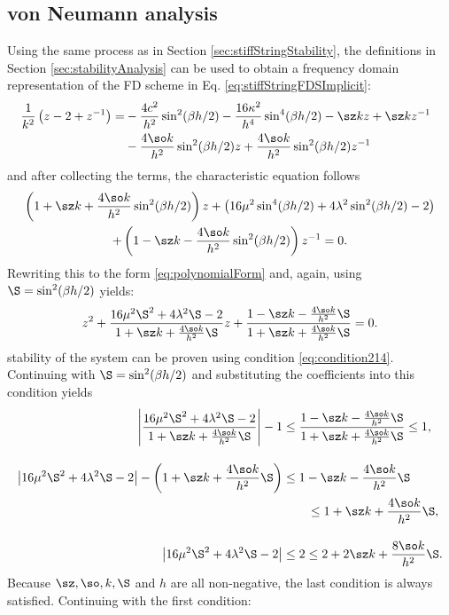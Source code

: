 {\subsection{von Neumann analysis}
Using the same process as in Section \ref{sec:stiffStringStability}, the definitions in Section \ref{sec:stabilityAnalysis} can be used to obtain a frequency domain representation of the FD scheme in Eq. \eqref{eq:stiffStringFDSImplicit}:
\begin{align}
    \!\!\!\!\frac{1}{k^2}\left(z - 2 + z^{-1}\right) =&-\frac{4c^2}{h^2}\sin^2(\beta h/2) - \frac{16\kappa^2}{h^4}\sin^4(\beta h/2) - \sz kz + \sz k z^{-1}\nonumber\\
    & - \frac{4 \so  k}{h^2}\sin^2(\beta h/2)z + \frac{4 \so  k}{h^2} \sin^2(\beta h/2)z^{-1}
\end{align}
and after collecting the terms, the characteristic equation follows
\begin{gather}
\left(1+\sz k + \frac{4\so k}{h^2}\sin^2(\beta h/2)\right)z + \left(16\mu^2\sin^4(\beta h/2)+4\lambda^2\sin^2(\beta h/2) - 2\right)\nonumber\\
+ \left(1-\sz k - \frac{4\so k}{h^2}\sin^2(\beta h/2)\right)z^{-1} = 0.\label{eq:charDampedStiffSTring}
\end{gather}
Rewriting this to the form \eqref{eq:polynomialForm} and, again, using $\S = \sin^2(\beta h / 2)$ yields:
\begin{equation*}
z^2 + \frac{16\mu^2\S^2+4\lambda^2\S - 2}{1+\sz k + \frac{4\so k}{h^2}\S}z+\frac{1-\sz k - \frac{4\so k}{h^2}\S}{1+\sz k + \frac{4\so k}{h^2}\S} = 0.
\end{equation*}
stability of the system can be proven using condition \eqref{eq:condition214}. Continuing with $\S = \sin^2(\beta h/2)$ and substituting the coefficients into this condition yields
\begin{align*}
\left|\frac{16\mu^2\S^2+4\lambda^2\S - 2}{1+\sz k + \frac{4\so k}{h^2}\S} \right|-1 &\leq \frac{1-\sz k - \frac{4\so k}{h^2}\S}{1+\sz k + \frac{4\so k}{h^2}\S}\leq 1,\\[1em]
\left|16\mu^2\S^2+4\lambda^2\S - 2 \right| - \left(1+\sz k + \frac{4\so k}{h^2}\S\right) &\leq 1-\sz k - \frac{4\so k}{h^2}\S\\
&\qquad\leq 1+\sz k + \frac{4\so k}{h^2}\S,\\[1em]
\left|16\mu^2\S^2+4\lambda^2\S - 2 \right|&\leq 2 \leq 2+2\sz k + \frac{8\so k}{h^2}\S.
\end{align*} 
Because $\sz, \so, k, \S$ and $h$ are all non-negative, the last condition is always satisfied. Continuing with the first condition:
}
